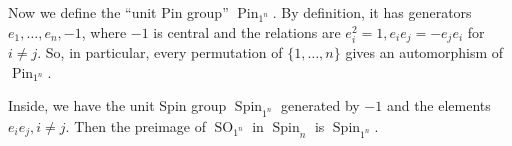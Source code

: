 \documentclass[12pt]{amsart}
\theoremstyle{definition}
\numberwithin{equation}{section}
\begin{document}
Now we define the ``unit Pin group'' $\operatorname{Pin}_{1^n}$. By definition,
it has generators $e_1,\ldots,e_n,-1$, where $-1$ is central and the relations
are $e_i^2=1, e_ie_j=-e_je_i$ for $i\neq j$. So, in particular, every permutation
of $\{1,\ldots,n\}$ gives an automorphism of $\operatorname{Pin}_{1^n}$.

Inside, we have the unit Spin group
$\operatorname{Spin}_{1^n}$ generated by $-1$ and the elements $e_ie_j, i\neq j$.
Then the preimage of $\operatorname{SO}_{1^n}$ in $\operatorname{Spin}_n$
is $\operatorname{Spin}_{1^n}$.
\end{document}
